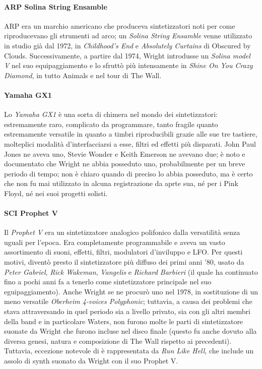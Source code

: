 \documentclass[class=book, crop=false, oneside, 12pt]{standalone}
\begin{document}
    \paragraph{ARP Solina String Ensamble}
    ARP era un marchio americano che produceva sintetizzatori noti per come riproducevano gli strumenti ad arco; un \emph{Solina String Ensamble} venne utilizzato in studio già dal 1972, in \emph{Childhood's End} e \emph{Absolutely Curtains} di Obscured by Clouds. Successivamente, a partire dal 1974, Wright introdusse un \emph{Solina model V} nel suo equipaggiamento e lo sfruttò più intensamente in \emph{Shine On You Crazy Diamond}, in tutto Animals e nel tour di The Wall.

    \paragraph{Yamaha GX1}
    Lo \emph{Yamaha GX1} è una sorta di chimera nel mondo dei sintetizzatori: estremamente raro, complicato da programmare, tanto fragile quanto estremamente versatile in quanto a timbri riproducibili grazie alle sue tre tastiere, molteplici modalità d'interfacciarsi a esse, filtri ed effetti più disparati. John Paul Jones ne aveva uno, Stevie Wonder e Keith Emerson ne avevano due; è noto e documentato che Wright ne abbia posseduto uno, probabilmente per un breve periodo di tempo; non è chiaro quando di preciso lo abbia posseduto, ma è certo che non fu mai utilizzato in alcuna registrazione da aprte sua, né per i Pink  Floyd, né nei suoi progetti solisti.

    \paragraph{SCI Prophet V}
    Il \emph{Prophet V} era un sintetizzatore analogico polifonico dalla versatilità senza uguali per l'epoca. Era completamente programmabile e aveva un vasto assortimento di suoni, effetti, filtri, modulatori d'inviluppo e LFO. Per questi motivi, diventò presto il sintetizzatore più diffuso dei primi anni '80, usato da \emph{Peter Gabriel}, \emph{Rick Wakeman}, \emph{Vangelis} e \emph{Richard Barbieri} (il quale ha continuato fino a pochi anni fa a tenerlo come sintetizzatore principale nel suo eguipaggiamento). Anche Wright se ne procurò uno nel 1978, in sostituzione di un meno versatile \emph{Oberheim 4-voices Polyphonic}; tuttavia, a causa dei problemi che stava attraversando in quel periodo sia a livello privato, sia con gli altri membri della band e in particolare Waters, non furono molte le parti di sintetizzatore suonate da Wright che furono incluse nel disco finale (questo fu anche dovuto alla diversa genesi, natura e composizione di The Wall rispetto ai precedenti). Tuttavia, eccezione notevole di è rappresentata da \emph{Run Like Hell}, che include un assolo di synth suonato da Wright con il suo Prophet V.
\end{document}
